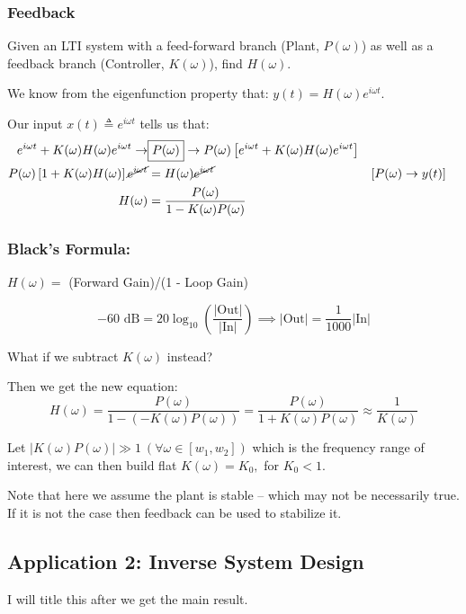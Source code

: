 \subsubsection{Feedback}
Given an LTI system with a feed-forward branch (Plant, $P(\omega)$) as well as a feedback branch (Controller, $K(\omega)$), find $H(\omega)$.

We know from the eigenfunction property that: $y(t)= H(\omega)e^{i\omega t}$.

Our input $x(t)\triangleq e^{i\omega t}$ tells us that:
\begin{align*}
    e^{i\omega t} + K(\omega)H(\omega)e^{i\omega t}
    \to 
    &\boxed{P(\omega)}
    \to P(\omega)\left[e^{i\omega t}
    +
    K(\omega)H(\omega)e^{i\omega t}\right]
    \\
    P(\omega)\left[1+ K(\omega)H(\omega)\right]\cancel{e^{i\omega t}}
    &=
    H(\omega)\cancel{e^{i\omega t}}
    &&\text{[$P(\omega) \to y(t)$]}
    \\
    H(\omega)
    &=
    \frac{P(\omega)}{1-K(\omega)P(\omega)}
\end{align*}

\subsubsection{Black's Formula:}
$H(\omega)=$ (Forward Gain)/(1 - Loop Gain)

\hrulefill

\[
    -60 \text{ dB}
    = 20\log_{10}\left(\frac{|\text{Out}|}{|\text{In}|}\right)
    \implies
    |\text{Out}|=\frac1{1000}|\text{In}|
\]

\hrulefill

What if we subtract $K(\omega)$ instead?


Then we get the new equation:
\[
    H(\omega)
    =
    \frac{P(\omega)}{1-(-K(\omega)P(\omega))}
    =
    \frac{P(\omega)}{1+K(\omega)P(\omega)}
    \approx
    \frac1{K(\omega)}
\]

Let $|K(\omega)P(\omega)|\gg1 
\ (\forall\omega\in[w_1, w_2])$ which is the frequency range of interest, we can then build flat $K(\omega)=K_0,$
 for $K_0<1$.
 
Note that here we assume the plant is stable -- which may not be necessarily true. If it is not the case then feedback can be used to stabilize it.

\subsection{Application 2: Inverse System Design}
I will title this after we get the main result.

